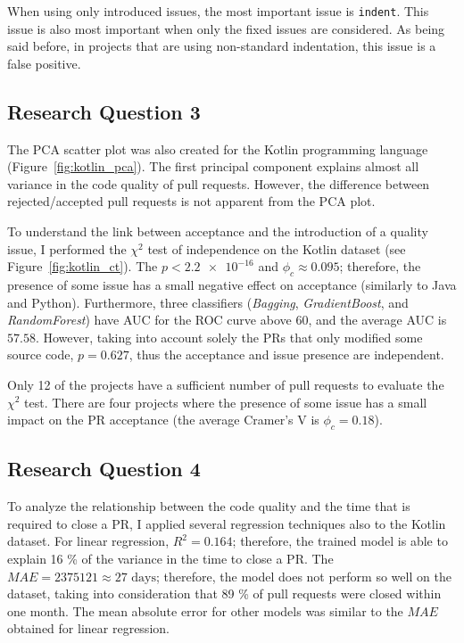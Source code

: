 \documentclass[digital,oneside,oldtable,nolof,nolot,nocover]{fithesis4}
\begin{document}
When using only introduced issues, the most important issue is \texttt{indent}.
This issue is also most important when only the fixed issues are considered.
As being said before, in projects that are using non-standard indentation,
this issue is a false positive.
\subsection{Research Question 3}
\label{sec:orgb9c3daa}
The PCA scatter plot was also created for the Kotlin programming language (Figure~\ref{fig:kotlin_pca}).
The first principal component explains almost all variance in the code quality of pull requests.
However, the difference between rejected/accepted pull requests is not apparent from the PCA plot.

To understand the link between acceptance and the introduction of a
quality issue, I performed the \(\chi^2\) test of independence
on the Kotlin dataset (see Figure~\ref{fig:kotlin_ct}).
The \(p < \num{2.2e-16}\) and \(\phi_c \approx 0.095\); therefore, the presence of some issue has a small
negative effect on acceptance (similarly to Java and Python).
Furthermore, three classifiers (\emph{Bagging}, \emph{GradientBoost}, and \emph{RandomForest})
have AUC for the ROC curve above 60, and the average AUC is \(57.58\).
However, taking into account solely the PRs that only modified some source
code, \(p = 0.627\), thus the acceptance and issue presence are independent.

Only 12 of the projects have a sufficient number of pull requests to evaluate
the \(\chi^2\) test. There are four projects where the presence of some issue
has a small impact on the PR acceptance (the average Cramer's V is \(\phi_c = 0.18\)).
\subsection{Research Question 4}
\label{sec:orgecb5943}
To analyze the relationship between the code quality and the time that is required to
close a PR, I applied several regression techniques also to the Kotlin
dataset.  For linear regression, \(R^2 = 0.164\); therefore, the trained model is
able to explain 16 \% of the variance in the time to close a PR. The \(MAE =
    2375121 \approx 27\text{ days}\); therefore, the model does not perform so well
on the dataset, taking into consideration that 89 \% of pull requests were
closed within one month. The mean absolute error for other models was similar
to the \(MAE\) obtained for linear regression.
\FloatBarrier
\end{document}
